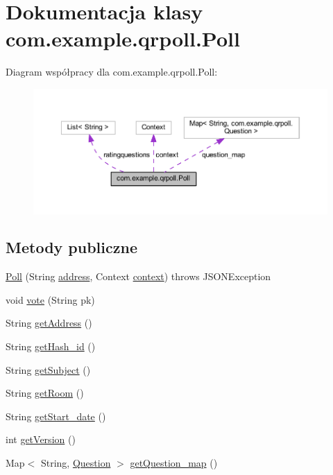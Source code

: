 \hypertarget{classcom_1_1example_1_1qrpoll_1_1_poll}{\section{Dokumentacja klasy com.\+example.\+qrpoll.\+Poll}
\label{classcom_1_1example_1_1qrpoll_1_1_poll}
}


Diagram współpracy dla com.\+example.\+qrpoll.\+Poll\+:
\nopagebreak
\begin{figure}[H]
\begin{center}
\leavevmode
\includegraphics[width=350pt]{classcom_1_1example_1_1qrpoll_1_1_poll__coll__graph}
\end{center}
\end{figure}
\subsection*{Metody publiczne}
\begin{DoxyCompactItemize}
\item 
\hyperlink{classcom_1_1example_1_1qrpoll_1_1_poll_a67b9e49c516a9c614e1e9964f151ed5e}{Poll} (String \hyperlink{classcom_1_1example_1_1qrpoll_1_1_poll_a284d664b1db022d0fe8f089c4cad5ead}{address}, Context \hyperlink{classcom_1_1example_1_1qrpoll_1_1_poll_a22159bb6ccaf5330c7691c47fcb0ea00}{context})  throws J\+S\+O\+N\+Exception
\item 
void \hyperlink{classcom_1_1example_1_1qrpoll_1_1_poll_a18e558fa9d47671bff6fd21eaf7d4a10}{vote} (String pk)
\item 
String \hyperlink{classcom_1_1example_1_1qrpoll_1_1_poll_ac84c3d1747b6eb8d4f43da448de8080f}{get\+Address} ()
\item 
String \hyperlink{classcom_1_1example_1_1qrpoll_1_1_poll_ab6bbc4a6d847d1f6b64543007c3a551c}{get\+Hash\+\_\+id} ()
\item 
String \hyperlink{classcom_1_1example_1_1qrpoll_1_1_poll_af744727f34328a8fec2cb1aba1bc5f66}{get\+Subject} ()
\item 
String \hyperlink{classcom_1_1example_1_1qrpoll_1_1_poll_a4622b5c93daf183b787ecad660a207ad}{get\+Room} ()
\item 
String \hyperlink{classcom_1_1example_1_1qrpoll_1_1_poll_a51e13329a38c4ee0fc09ccac02ae5afe}{get\+Start\+\_\+date} ()
\item 
int \hyperlink{classcom_1_1example_1_1qrpoll_1_1_poll_a6ec1751ddf25a1b00173e1c4f3203458}{get\+Version} ()
\item 
Map$<$ String, \hyperlink{classcom_1_1example_1_1qrpoll_1_1_question}{Question} $>$ \hyperlink{classcom_1_1example_1_1qrpoll_1_1_poll_a505fc3d6479ef24c04adb022acc366c8}{get\+Question\+\_\+map} ()
\end{DoxyCompactItemize}
